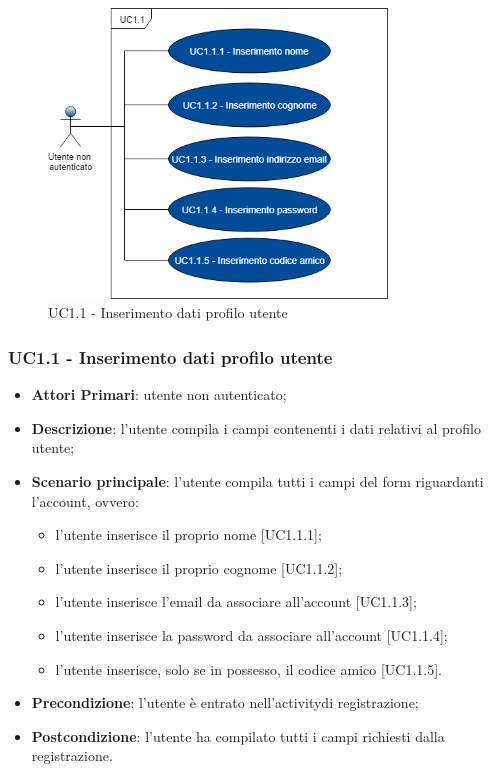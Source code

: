 \begin{figure}
	\includegraphics[width=9cm]{res/images/UC1-1Inserimento.png}
	\centering
	\caption{UC1.1 - Inserimento dati profilo utente}
\end{figure}
\subsubsection{UC1.1 - Inserimento dati profilo utente}
\begin{itemize}
	\item \textbf{Attori Primari}: utente non autenticato;
	\item \textbf{Descrizione}: l'utente compila i campi contenenti i dati relativi al profilo utente;
	\item \textbf{Scenario principale}: l'utente compila tutti i campi del form riguardanti l'account, ovvero:
		\begin{itemize}
			\item l'utente inserisce il proprio nome [UC1.1.1];
			\item l'utente inserisce il proprio cognome [UC1.1.2];
			\item l'utente inserisce l'email da associare all'account [UC1.1.3];
			\item l'utente inserisce la password da associare all'account [UC1.1.4];
			\item l'utente inserisce, solo se in possesso, il codice amico [UC1.1.5].
		\end{itemize}
	\item \textbf{Precondizione}: l'utente è entrato nell'activity\glosp di registrazione;
	\item \textbf{Postcondizione}: l'utente ha compilato tutti i campi richiesti dalla registrazione.
\end{itemize}
\newpage
